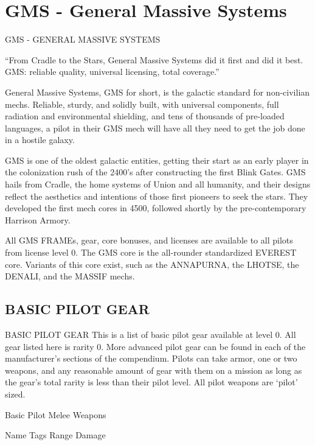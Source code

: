 \section{GMS - General Massive Systems}

 GMS - GENERAL MASSIVE SYSTEMS  

    “From Cradle to the Stars, General Massive Systems did it first and did it best. GMS:  
                         reliable quality, universal licensing, total coverage.”   

General Massive Systems, GMS for short, is the galactic standard for non-civilian mechs.  
Reliable, sturdy, and solidly built, with universal components, full radiation and environmental  
shielding, and tens of thousands of pre-loaded languages, a pilot in their GMS mech will have all  
they need to get the job done in a hostile galaxy.
 

GMS is one of the oldest galactic entities, getting their start as an early player in the colonization  
rush of the 2400’s after constructing the first Blink Gates. GMS hails from Cradle, the home  
systems of Union and all humanity, and their designs reflect the aesthetics and intentions of  
those first pioneers to seek the stars. They developed the first mech cores in 4500, followed  
shortly by the pre-contemporary Harrison Armory. 
 

All GMS FRAMEs, gear, core bonuses, and licenses are available to all pilots from license  
level 0. The GMS core is the all-rounder standardized EVEREST core. Variants of this core exist,  
such as the ANNAPURNA, the LHOTSE, the DENALI, and the MASSIF mechs.

\subsection{BASIC PILOT GEAR}
                                         BASIC PILOT GEAR  
This is a list of basic pilot gear available at level 0. All gear listed here is rarity 0. More  
advanced pilot gear can be found in each of the manufacturer’s sections of the compendium.  
Pilots can take armor, one or two weapons, and any reasonable amount of gear with them on a  
mission as long as the gear’s total rarity is less than their pilot level. All pilot weapons are ‘pilot’  
sized.
 

                                        Basic Pilot Melee Weapons  

 Name                      Tags                                       Range             Damage 

